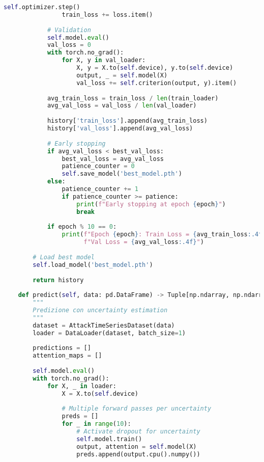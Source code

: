\begin{lstlisting}[language=Python, caption=LSTM per Previsione Pattern di Attacco]
                self.optimizer.step()
                train_loss += loss.item()
            
            # Validation
            self.model.eval()
            val_loss = 0
            with torch.no_grad():
                for X, y in val_loader:
                    X, y = X.to(self.device), y.to(self.device)
                    output, _ = self.model(X)
                    val_loss += self.criterion(output, y).item()
            
            avg_train_loss = train_loss / len(train_loader)
            avg_val_loss = val_loss / len(val_loader)
            
            history['train_loss'].append(avg_train_loss)
            history['val_loss'].append(avg_val_loss)
            
            # Early stopping
            if avg_val_loss < best_val_loss:
                best_val_loss = avg_val_loss
                patience_counter = 0
                self.save_model('best_model.pth')
            else:
                patience_counter += 1
                if patience_counter >= patience:
                    print(f"Early stopping at epoch {epoch}")
                    break
            
            if epoch % 10 == 0:
                print(f"Epoch {epoch}: Train Loss = {avg_train_loss:.4f}, "
                      f"Val Loss = {avg_val_loss:.4f}")
        
        # Load best model
        self.load_model('best_model.pth')
        
        return history
    
    def predict(self, data: pd.DataFrame) -> Tuple[np.ndarray, np.ndarray]:
        """
        Predizione con uncertainty estimation
        """
        dataset = AttackTimeSeriesDataset(data)
        loader = DataLoader(dataset, batch_size=1)
        
        predictions = []
        attention_maps = []
        
        self.model.eval()
        with torch.no_grad():
            for X, _ in loader:
                X = X.to(self.device)
                
                # Multiple forward passes per uncertainty
                preds = []
                for _ in range(10):
                    # Activate dropout for uncertainty
                    self.model.train()
                    output, attention = self.model(X)
                    preds.append(output.cpu().numpy())
                

\end{lstlisting}
